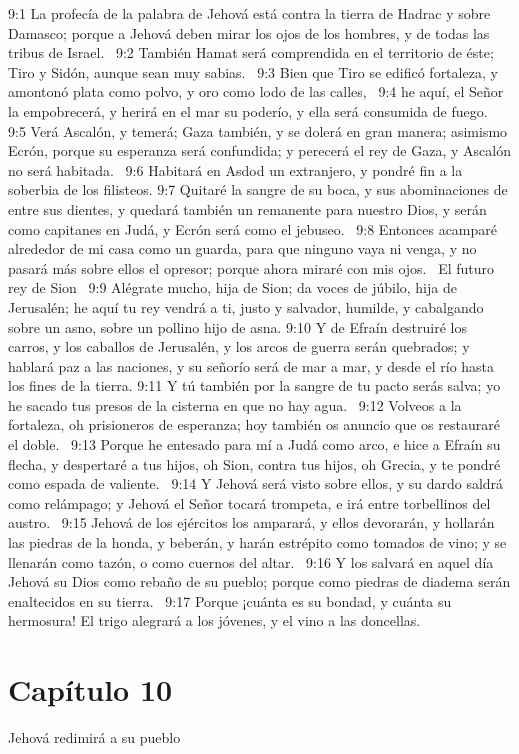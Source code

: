 9:1 La profecía de la palabra de Jehová está contra la tierra de Hadrac y sobre Damasco; porque a Jehová deben mirar los ojos de los hombres, y de todas las tribus de Israel.  
9:2 También Hamat será comprendida en el territorio de éste; Tiro y Sidón, aunque sean muy sabias.  
9:3 Bien que Tiro se edificó fortaleza, y amontonó plata como polvo, y oro como lodo de las calles,  
9:4 he aquí, el Señor la empobrecerá, y herirá en el mar su poderío, y ella será consumida de fuego.  
9:5 Verá Ascalón, y temerá; Gaza también, y se dolerá en gran manera; asimismo Ecrón, porque su esperanza será confundida; y perecerá el rey de Gaza, y Ascalón no será habitada.  
9:6 Habitará en Asdod un extranjero, y pondré fin a la soberbia de los filisteos. 
9:7 Quitaré la sangre de su boca, y sus abominaciones de entre sus dientes, y quedará también un remanente para nuestro Dios, y serán como capitanes en Judá, y Ecrón será como el jebuseo.  
9:8 Entonces acamparé alrededor de mi casa como un guarda, para que ninguno vaya ni venga, y no pasará más sobre ellos el opresor; porque ahora miraré con mis ojos.  
El futuro rey de Sion  
9:9 Alégrate mucho, hija de Sion; da voces de júbilo, hija de Jerusalén; he aquí tu rey vendrá a ti, justo y salvador, humilde, y cabalgando sobre un asno, sobre un pollino hijo de asna. 
9:10 Y de Efraín destruiré los carros, y los caballos de Jerusalén, y los arcos de guerra serán quebrados; y hablará paz a las naciones, y su señorío será de mar a mar, y desde el río hasta los fines de la tierra. 
9:11 Y tú también por la sangre de tu pacto serás salva; yo he sacado tus presos de la cisterna en que no hay agua.  
9:12 Volveos a la fortaleza, oh prisioneros de esperanza; hoy también os anuncio que os restauraré el doble.  
9:13 Porque he entesado para mí a Judá como arco, e hice a Efraín su flecha, y despertaré a tus hijos, oh Sion, contra tus hijos, oh Grecia, y te pondré como espada de valiente.  
9:14 Y Jehová será visto sobre ellos, y su dardo saldrá como relámpago; y Jehová el Señor tocará trompeta, e irá entre torbellinos del austro.  
9:15 Jehová de los ejércitos los amparará, y ellos devorarán, y hollarán las piedras de la honda, y beberán, y harán estrépito como tomados de vino; y se llenarán como tazón, o como cuernos del altar.  
9:16 Y los salvará en aquel día Jehová su Dios como rebaño de su pueblo; porque como piedras de diadema serán enaltecidos en su tierra.  
9:17 Porque ¡cuánta es su bondad, y cuánta su hermosura! El trigo alegrará a los jóvenes, y el vino a las doncellas.  
\section*{Capítulo 10 }
Jehová redimirá a su pueblo  

